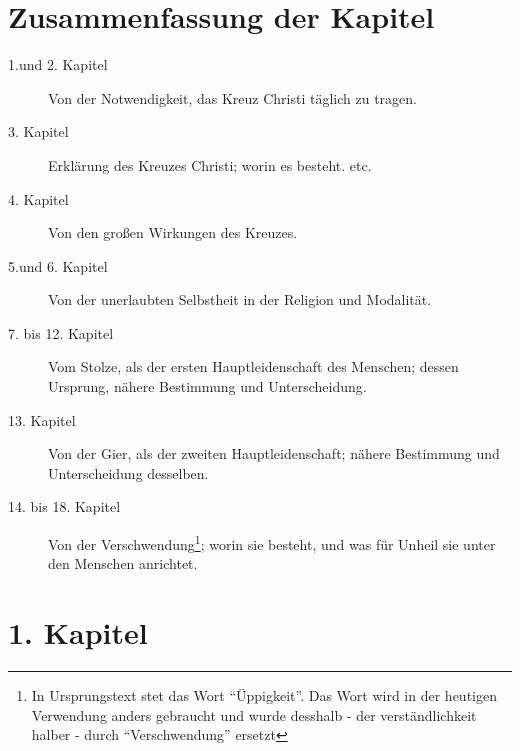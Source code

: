 
\chapter{Zusammenfassung der Kapitel}
\begin{description}
\item[1.und 2. Kapitel] Von der Notwendigkeit, das Kreuz Christi täglich zu
tragen.
\item[3. Kapitel] Erklärung des Kreuzes Christi; worin es besteht. etc.
\item[4. Kapitel] Von den großen Wirkungen des Kreuzes.
\item[5.und 6. Kapitel] Von der unerlaubten Selbstheit in der Religion und
Modalität.
\item[7. bis 12. Kapitel] Vom Stolze, als der ersten Hauptleidenschaft des
Menschen; dessen Ursprung, nähere Bestimmung und Unterscheidung.
\item[13. Kapitel] Von der Gier, als der zweiten Hauptleidenschaft; nähere
Bestimmung und Unterscheidung desselben.
\item[14. bis 18. Kapitel] Von der Verschwendung\footnote{In Ursprungstext stet
das Wort "`Üppigkeit"'. Das Wort wird in der heutigen Verwendung anders
gebraucht und wurde desshalb - der verständlichkeit halber - durch
"`Verschwendung"' ersetzt}; worin sie besteht, und was für Unheil sie unter den
Menschen anrichtet.
\end{description}

\chapter{1. Kapitel}

